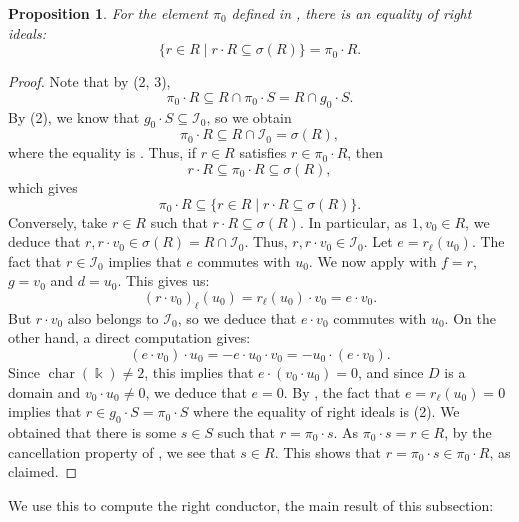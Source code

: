 \documentclass{amsart}
\newtheorem{prop}[equation]{Proposition}
\theoremstyle{definition}
\newcommand{\opn}{\operatorname}
\renewcommand{\k}{\Bbbk}
\numberwithin{equation}{section}
\begin{document}
\begin{prop}\label{prop:left-conductor}
For the element $\pi_0$ defined in ,
there is an equality of right ideals:
\[
\{r \in R \mid r\cdot R \subseteq \sigma(R)\} = \pi_0 \cdot R.
\]
\end{prop}
\begin{proof}
Note that by 
(2, 3),
\[
\pi_0 \cdot R \subseteq R \cap \pi_0 \cdot S = R \cap g_0 \cdot S.
\]
By (2), we know that $g_0 \cdot S \subseteq \mathcal{I}_0$,
so we obtain
\[
\pi_0 \cdot R \subseteq R \cap \mathcal{I}_0 = \sigma(R),
\]
where the equality is .
Thus, if $r \in R$ satisfies $r \in \pi_0 \cdot R$,
then
\[
r\cdot R \subseteq \pi_0 \cdot R \subseteq \sigma(R),
\]
which gives
\[
\pi_0 \cdot R \subseteq \{r \in R \mid r\cdot R \subseteq \sigma(R)\}.
\]
Conversely, take $r \in R$ such that $r\cdot R \subseteq \sigma(R)$.
In particular, as $1, v_0 \in R$, we deduce that $r, r\cdot v_0 \in \sigma(R) = R \cap \mathcal{I}_0$.
Thus, $r, r\cdot v_0 \in \mathcal{I}_0$.
Let $e = r_{\ell}(u_0)$.
The fact that $r \in \mathcal{I}_0$ implies that $e$ commutes with $u_0$.
We now apply  with $f = r$, $g = v_0$ and $d = u_0$.
This gives us:
\[
(r\cdot v_0)_{\ell}(u_0) = r_{\ell}(u_0) \cdot v_0 = e \cdot v_0.
\]
But $r\cdot v_0$ also belongs to $\mathcal{I}_0$,
so we deduce that $e\cdot v_0$ commutes with $u_0$.
On the other hand, a direct computation gives:
\[
(e\cdot v_0) \cdot u_0 =  - e\cdot u_0 \cdot v_0 = - u_0 \cdot (e\cdot v_0).
\]
Since $\opn{char}(\k) \ne 2$,
this implies that $e\cdot (v_0 \cdot u_0) = 0$,
and since $D$ is a domain and $v_0 \cdot u_0 \ne 0$,
we deduce that $e = 0$.
By , the fact that $e = r_{\ell}(u_0) = 0$ implies that $r \in g_0 \cdot S = \pi_0 \cdot S$ where the equality of right ideals is (2).
We obtained that there is some $s \in S$ such that $r = \pi_0 \cdot s$.
As $\pi_0 \cdot s = r \in R$, by the cancellation property of , we see that $s \in R$.
This shows that $r = \pi_0 \cdot s \in \pi_0\cdot R$, 
as claimed.
\end{proof}

We use this to compute the right conductor,
the main result of this subsection:
\end{document}
